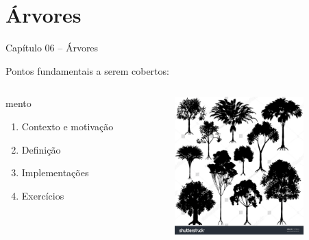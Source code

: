 \section{Árvores}

\begin{frame}

\begin{center}
{\Large Capítulo 06 -- Árvores}
\end{center}

Pontos fundamentais a serem cobertos:
\begin{columns}
\begin{column}{.3\textwidth}mento

\centering

  \begin{enumerate}
  \item Contexto e motivação

  \item Definição

  \item Implementações

  \item Exercícios 

\end{enumerate}  

\end{column}
\begin{column}{.7\textwidth}
\centering
\includegraphics[height=5.3cm, width=7cm]{figs/fig_arvores/arv_CAPA.jpg}
\hspace{+0.25cm}
\end{column}
\end{columns}


\end{frame}
